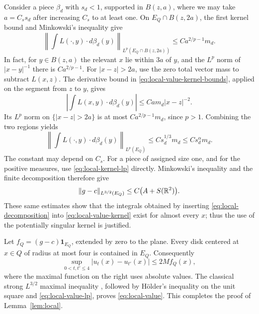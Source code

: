 Consider a piece $\beta_d$ with $s_d<1$, supported in
$B(z,a)$, where we may take $a=C_s s_d$ after increasing $C_s$
to at least one. On $E_Q\cap B(z,2a)$, the first kernel bound and
Minkowski's inequality give
\[
\left\|\int L(\cdot,y)\cdot d\beta_d(y)\right\|_
                       {L^p(E_Q\cap B(z,2a))}
 \le C a^{2/p-1}m_d.
\]
In fact, for $y\in B(z,a)$ the relevant $x$ lie within $3a$ of
$y$, and the $L^p$ norm of $|x-y|^{-1}$ there is
$C a^{2/p-1}$.
For $|x-z|>2a$, use the zero total vector mass to subtract
$L(x,z)$. The derivative bound in
\eqref{eq:local-value-kernel-bounds}, applied on the segment from
$z$ to $y$, gives
\[
\left|\int L(x,y)\cdot d\beta_d(y)\right|
 \le C a m_d|x-z|^{-2}.
\]
Its $L^p$ norm on $\{|x-z|>2a\}$ is at most
$C a^{2/p-1}m_d$, since $p>1$. Combining the two regions yields
\begin{equation}\label{eq:local-value-piece}
\left\|\int L(\cdot,y)\cdot d\beta_d(y)\right\|_{L^p(E_Q)}
 \le C s_d^{1/3}m_d\le C s_d^\alpha m_d.
\end{equation}
The constant may depend on $C_s$. For a piece of assigned size
one, and for the positive measures, use
\eqref{eq:local-kernel-lp} directly. Minkowski's inequality and the
finite decomposition therefore give
\begin{equation}\label{eq:local-value-lp}
\|g-c\|_{L^{3/2}(E_Q)}\le C\bigl(A+S(\mathbb R^2)\bigr).
\end{equation}
These same estimates show that the integrals obtained by inserting
\eqref{eq:local-decomposition} into \eqref{eq:local-value-kernel}
exist for almost every $x$; thus the use of the potentially singular
kernel is justified.

Let $f_Q=(g-c)\mathbf1_{E_Q}$, extended by zero to the plane.
Every disk centered at $x\in Q$ of radius at most four is contained
in $E_Q$. Consequently
\[
\sup_{0<t,t'\le4}|u_t(x)-u_{t'}(x)|\le2Mf_Q(x),
\]
where the maximal function on the right uses absolute values.
The classical strong $L^{3/2}$ maximal inequality
\cite[(1.2)]{Kinnunen1997}, followed by H\"older's inequality on the unit square and
\eqref{eq:local-value-lp}, proves \eqref{eq:local-value}. This
completes the proof of Lemma~\ref{lem:local}.
